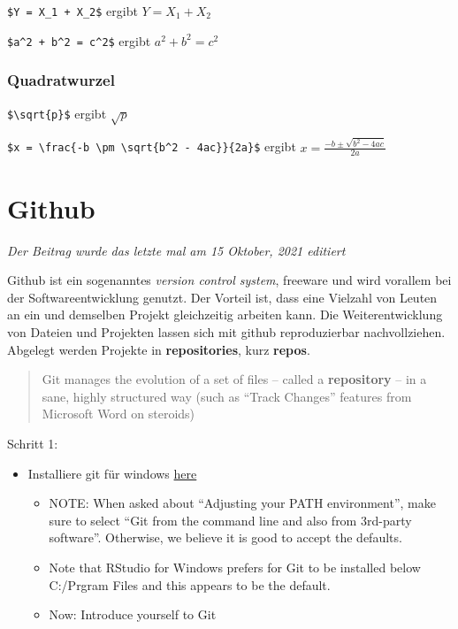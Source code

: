 \documentclass[
]{article}
\providecommand{\tightlist}{%
  \setlength{\itemsep}{0pt}\setlength{\parskip}{0pt}}
\begin{document}
\texttt{\$Y\ =\ X\_1\ +\ X\_2\$} ergibt \(Y = X_1 + X_2\)

\texttt{\$a\^{}2\ +\ b\^{}2\ =\ c\^{}2\$} ergibt \(a^2 + b^2 = c^2\)

\hypertarget{quadratwurzel}{%
\subsubsection{Quadratwurzel}\label{quadratwurzel}}

\texttt{\$\textbackslash{}sqrt\{p\}\$} ergibt \(\sqrt{p}\)

\texttt{\$x\ =\ \textbackslash{}frac\{-b\ \textbackslash{}pm\ \textbackslash{}sqrt\{b\^{}2\ -\ 4ac\}\}\{2a\}\$} ergibt \(x = \frac{-b \pm \sqrt{b^2 - 4ac}}{2a}\)

\hypertarget{github}{%
\section{Github}\label{github}}

\emph{Der Beitrag wurde das letzte mal am 15 Oktober, 2021 editiert}

Github ist ein sogenanntes \emph{version control system}, freeware und wird vorallem bei der Softwareentwicklung genutzt. Der Vorteil ist, dass eine Vielzahl von Leuten an ein und demselben Projekt gleichzeitig arbeiten kann. Die Weiterentwicklung von Dateien und Projekten lassen sich mit github reproduzierbar nachvollziehen. Abgelegt werden Projekte in \textbf{repositories}, kurz \textbf{repos}.

\begin{quote}
Git manages the evolution of a set of files -- called a \textbf{repository} -- in a sane, highly structured way (such as ``Track Changes'' features from Microsoft Word on steroids)
\end{quote}

Schritt 1:

\begin{itemize}
\tightlist
\item
  Installiere git für windows \href{https://gitforwindows.org/}{here}

  \begin{itemize}
  \tightlist
  \item
    NOTE: When asked about ``Adjusting your PATH environment'', make
    sure to select ``Git from the command line and also from
    3rd-party software''. Otherwise, we believe it is good to accept
    the defaults.
  \item
    Note that RStudio for Windows prefers for Git to be installed
    below C:/Prgram Files and this appears to be the default.
  \item
    Now: Introduce yourself to Git
  \end{itemize}
\end{itemize}
\end{document}
